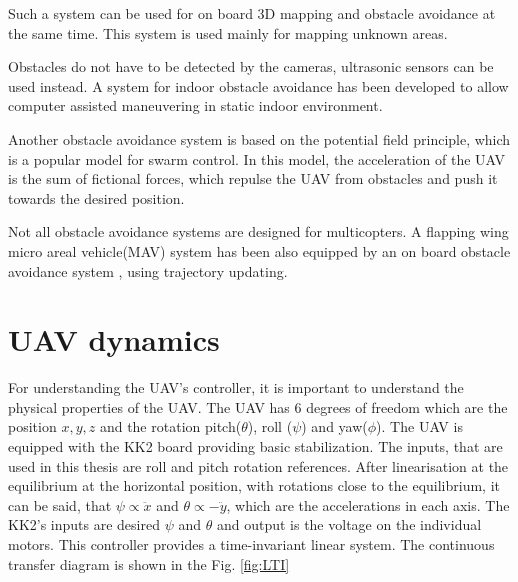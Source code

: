 \documentclass[a4paper,11pt,titlepage]{article}
\begin{document}
Such a system can be used for on board 3D mapping and obstacle avoidance\cite{weiss2011intuitive} at the same time. This system is used mainly for mapping unknown areas.

Obstacles do not have to be detected by the cameras, ultrasonic sensors can be used instead. A system for indoor obstacle avoidance\cite{gupta2015obstacle} has been developed to allow computer assisted maneuvering in static indoor environment. 

Another obstacle avoidance system is based on the potential field principle, which is a popular model for swarm control\cite{budiyanto2015uav}. In this model, the acceleration of the UAV is the sum of fictional forces, which repulse the UAV from obstacles and push it	 towards the desired position.

Not all obstacle avoidance systems are designed for multicopters. A flapping wing micro areal vehicle(MAV) system has been also equipped by an on board obstacle avoidance system \cite{tijmons2016obstacle}, using trajectory updating.


\section{UAV dynamics}
For understanding the UAV's controller, it is important to understand the physical properties of the UAV. The UAV has 6 degrees of freedom which are the position $x, y, z$ and the rotation pitch($\theta$), roll ($\psi$) and yaw($\phi$). The UAV is equipped with the KK2 board providing basic stabilization. The inputs, that are used in this thesis are roll and pitch rotation references. After linearisation at the equilibrium at the horizontal position, with rotations close to the equilibrium, it can be said, that $\psi \propto \ddot{x}$ and $\theta \propto -\ddot{y}$, which are the accelerations in each axis. The KK2's inputs are desired $\psi$ and $\theta$ and output is the voltage on the individual motors. This controller provides a time-invariant linear system. The continuous transfer diagram is shown in the Fig. \ref{fig:LTI}
\end{document}
